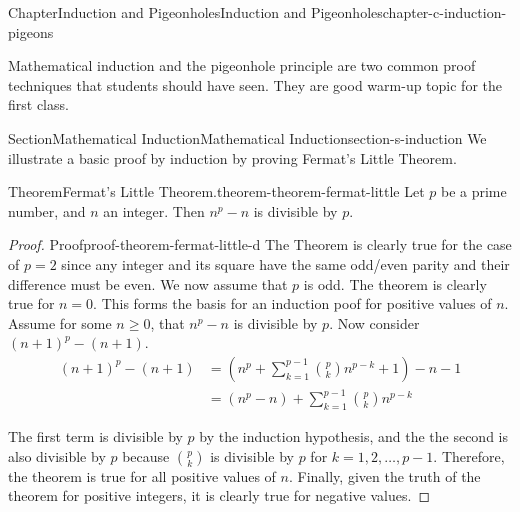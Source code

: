 \documentclass[oneside,10pt,]{book}
\numberwithin{equation}{section}
\newcommand{\amp}{&}
\begin{document}
%
%
\typeout{************************************************}
\typeout{************************************************}
%
\begin{chapterptx}{Chapter}{Induction and Pigeonholes}{}{Induction and Pigeonholes}{}{}{chapter-c-induction-pigeons}
\renewcommand*{\chaptername}{Chapter}
\begin{introduction}{}%
Mathematical induction and the pigeonhole principle are two common proof techniques that students should have seen.  They are good warm-up topic for the first class.%
\end{introduction}%
%
%
\typeout{************************************************}
\typeout{************************************************}
%
\begin{sectionptx}{Section}{Mathematical Induction}{}{Mathematical Induction}{}{}{section-s-induction}
%
We illustrate a basic proof by induction by proving Fermat's Little Theorem.%
\begin{theorem}{Theorem}{Fermat's Little Theorem.}{}{theorem-theorem-fermat-little}%
%
Let \(p\) be a prime number, and \(n\) an integer. Then \(n^p - n\) is divisible by \(p\).%
\end{theorem}
\begin{proof}{Proof}{}{proof-theorem-fermat-little-d}
The Theorem is clearly true for the case of \(p=2\) since any integer and its square have the same odd\slash{}even parity and their difference must be even.   We now assume that \(p\) is odd.   The theorem is clearly true for \(n=0\).  This forms the basis for an induction poof for positive values of \(n\).  Assume for some \(n \geq 0\), that  \(n^p - n\) is divisible by \(p\).  Now consider  \((n+1)^p - (n+1)\).%
\begin{align*}
(n+1)^p - (n+1) \amp=   \left( n^p+\sum_{k=1}^{p-1} { \binom{p}{k} n^{p-k} } + 1\right) -n -1 \\
\amp= (n^p -n)  +\sum_{k=1}^{p-1} {\binom{p}{k} n^{p-k} }
\end{align*}
%
\par
The first term is divisible by \(p\) by the induction hypothesis, and the the second is also divisible by \(p\) because \(\binom{p}{k}\) is divisible by \(p\) for \(k = 1, 2,\dots,p-1\).  Therefore, the theorem is true for all positive values of \(n\).  Finally, given the truth of the theorem for positive integers, it is clearly true for negative values.%

\end{proof}
\end{sectionptx}
\end{chapterptx}
\end{document}
